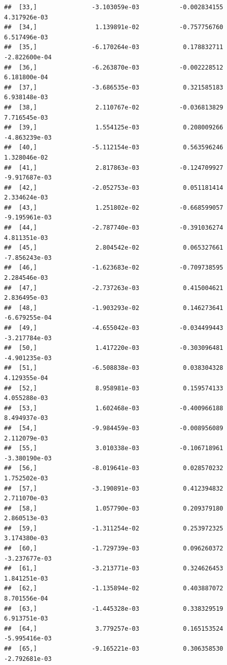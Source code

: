 \documentclass[11pt,preprint, authoryear]{elsarticle}
\numberwithin{equation}{section}
\numberwithin{figure}{section}
\numberwithin{table}{section}
\begin{document}
\begin{verbatim}
##  [33,]               -3.103059e-03           -0.002834155      4.317926e-03
##  [34,]                1.139891e-02           -0.757756760      6.517496e-03
##  [35,]               -6.170264e-03            0.178832711     -2.822600e-04
##  [36,]               -6.263870e-03           -0.002228512      6.181800e-04
##  [37,]               -3.686535e-03            0.321585183      6.938148e-03
##  [38,]                2.110767e-02           -0.036813829      7.716545e-03
##  [39,]                1.554125e-03            0.208009266     -4.863239e-03
##  [40,]               -5.112154e-03            0.563596246      1.328046e-02
##  [41,]                2.817863e-03           -0.124709927     -9.917687e-03
##  [42,]               -2.052753e-03            0.051181414      2.334624e-03
##  [43,]                1.251802e-02           -0.668599057     -9.195961e-03
##  [44,]               -2.787740e-03           -0.391036274      4.811351e-03
##  [45,]                2.804542e-02            0.065327661     -7.856243e-03
##  [46,]               -1.623683e-02           -0.709738595      2.284546e-03
##  [47,]               -2.737263e-03            0.415004621      2.836495e-03
##  [48,]               -1.903293e-02            0.146273641     -6.679255e-04
##  [49,]               -4.655042e-03           -0.034499443     -3.217784e-03
##  [50,]                1.417220e-03           -0.303096481     -4.901235e-03
##  [51,]               -6.508838e-03            0.038304328      4.129355e-04
##  [52,]                8.958981e-03            0.159574133      4.055288e-03
##  [53,]                1.602468e-03           -0.400966188      8.494937e-03
##  [54,]               -9.984459e-03           -0.008956089      2.112079e-03
##  [55,]                3.010338e-03           -0.106718961     -3.380190e-03
##  [56,]               -8.019641e-03            0.028570232      1.752502e-03
##  [57,]               -3.190891e-03            0.412394832      2.711070e-03
##  [58,]                1.057790e-03            0.209379180      2.860513e-03
##  [59,]               -1.311254e-02            0.253972325      3.174380e-03
##  [60,]               -1.729739e-03            0.096260372     -3.237677e-03
##  [61,]               -3.213771e-03            0.324626453      1.841251e-03
##  [62,]               -1.135894e-02            0.403887072      8.701556e-04
##  [63,]               -1.445328e-03            0.338329519      6.913751e-03
##  [64,]                3.779257e-03            0.165153524     -5.995416e-03
##  [65,]               -9.165221e-03            0.306358530     -2.792681e-03

\end{verbatim}
\end{document}
